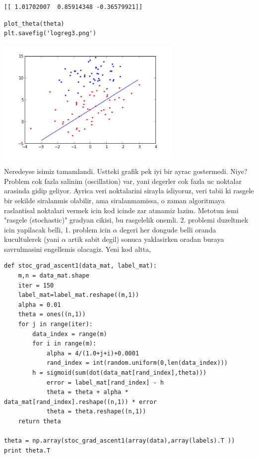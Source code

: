 \documentclass[12pt,fleqn]{article}\usepackage{../common}
\begin{document}
\begin{verbatim}
[[ 1.01702007  0.85914348 -0.36579921]]
\end{verbatim}

\begin{verbatim}
plot_theta(theta)
plt.savefig('logreg3.png')
\end{verbatim}

\includegraphics[height=6cm]{logreg3.png}

Neredeyse isimiz tamamlandi. Ustteki grafik pek iyi bir ayrac gostermedi.
Niye? Problem cok fazla salinim (oscillation) var, yani degerler cok fazla
uc noktalar arasinda gidip geliyor. Ayrica veri noktalarini sirayla isliyoruz,
veri tabii ki rasgele bir sekilde siralanmis olabilir, ama siralanmamissa,
o zaman algoritmaya raslantisal noktalari vermek icin kod icinde zar atmamiz
lazim. Metotun ismi "rasgele (stochastic)" gradyan cikisi, bu rasgelelik
onemli. 2. problemi duzeltmek icin yapilacak belli, 1. problem icin
$\alpha$ degeri her dongude belli oranda kucultulerek (yani $\alpha$ artik
sabit degil) sonuca yaklasirken oradan buraya savrulmasini engellemis
olacagiz. Yeni kod altta,

\begin{verbatim}
def stoc_grad_ascent1(data_mat, label_mat):
    m,n = data_mat.shape
    iter = 150
    label_mat=label_mat.reshape((m,1))
    alpha = 0.01
    theta = ones((n,1))
    for j in range(iter):
        data_index = range(m)
        for i in range(m):
            alpha = 4/(1.0+j+i)+0.0001  
            rand_index = int(random.uniform(0,len(data_index)))
	    h = sigmoid(sum(dot(data_mat[rand_index],theta)))
            error = label_mat[rand_index] - h
            theta = theta + alpha * data_mat[rand_index].reshape((n,1)) * error
            theta = theta.reshape((n,1))
    return theta

theta = np.array(stoc_grad_ascent1(array(data),array(labels).T ))
print theta.T
\end{verbatim}
\end{document}
